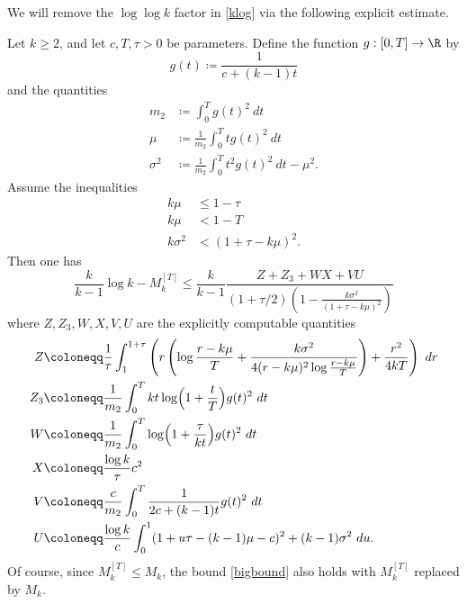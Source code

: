We will remove the $\log\log k$ factor in \eqref{klog} via the following explicit estimate.

\begin{theorem}  Let $k \geq 2$, and let $c,T,\tau > 0$ be parameters.  Define the function $g: [0,T] \to \R$ by
\begin{equation}\label{g-def}
 g(t) \coloneqq \frac{1}{c + (k-1) t}
\end{equation}
and the quantities
\begin{align}
m_2 &\coloneqq \int_0^T g(t)^2\ dt \label{m2-def}\\
\mu &\coloneqq \frac{1}{m_2} \int_0^T t g(t)^2\ dt \label{mu-def}\\
\sigma^2 &\coloneqq \frac{1}{m_2} \int_0^T t^2 g(t)^2\ dt - \mu^2.\label{sigma-def}
\end{align}
Assume the inequalities
\begin{align}
k\mu &\leq 1-\tau \label{tau-bound}\\
k\mu &< 1-T \label{T-bound}\\
k\sigma^2 &< (1+\tau-k\mu)^2. \label{ksb}
\end{align}
Then one has
\begin{equation}\label{bigbound}
 \frac{k}{k-1} \log k - M_k^{[T]} \leq \frac{k}{k-1} \frac{Z + Z_3 + WX + VU}{(1+\tau/2) (1 - \frac{k\sigma^2}{(1+\tau-k\mu)^2})}
\end{equation}
where $Z, Z_3, W, X, V, U$ are the explicitly computable quantities
\begin{align}
Z &\coloneqq \frac{1}{\tau} \int_1^{1+\tau}\left( r\left(\log\frac{r-k\mu}{T} + \frac{k\sigma^2}{4(r-k\mu)^2 \log \frac{r-k\mu}{T}} \right) + \frac{r^2}{4kT}\right)\ dr\label{z-def}\\
Z_3 &\coloneqq \frac{1}{m_2} \int_0^T kt \log\Bigl(1+\frac{t}{T}\Bigr) g(t)^2\ dt \label{z3-def}\\
W &\coloneqq \frac{1}{m_2} \int_0^T \log\Bigl(1+\frac{\tau}{kt}\Bigr) g(t)^2\ dt\label{W-def}\\
X &\coloneqq \frac{\log k}{\tau} c^2 \label{X-def}\\
V &\coloneqq \frac{c}{m_2} \int_0^T \frac{1}{2c + (k-1)t} g(t)^2\ dt \label{V-def} \\
U &\coloneqq \frac{\log k}{c} \int_0^1 (1 + u\tau- (k-1)\mu- c)^2 + (k-1) \sigma^2\ du.\label{U-def}
\end{align}
Of course, since $M_k^{[T]} \leq M_k$, the bound \eqref{bigbound} also holds with $M_k^{[T]}$ replaced by $M_k$.
\end{theorem}

